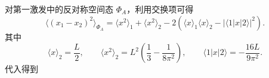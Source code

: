 \begin{question}
\begin{solution}
对第一激发中的反对称空间态 $\Phi_A$，利用交换项可得
\[
\langle (x_1-x_2)^2\rangle_{\Phi_A}=\langle x^2\rangle_1+\langle x^2\rangle_2-2\left(\langle x\rangle_1\langle x\rangle_2-|\langle 1|x|2\rangle|^2\right).
\]
其中
\[
\langle x\rangle_2=\frac{L}{2},
\qquad
\langle x^2\rangle_2=L^2\left(\frac13-\frac{1}{8\pi^2}\right),
\qquad
\langle 1|x|2\rangle=-\frac{16L}{9\pi^2}.
\]
代入得到
\end{solution}
\end{question}

